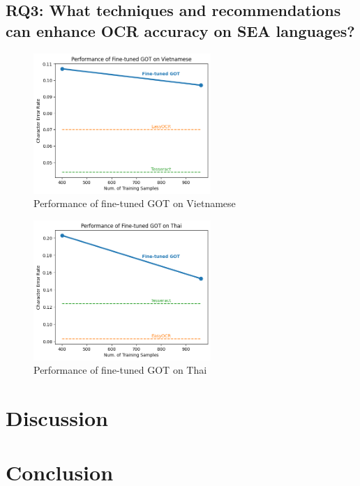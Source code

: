 \documentclass[12pt,oneside]{memoir}
\begin{document}
\section{RQ3: What techniques and recommendations can enhance OCR accuracy on SEA languages?}

\begin{figure}[ht]
    \centering
    \includegraphics[width=0.6\textwidth]{images/fine-tuned-got-vietnamese.png}
    \caption{Performance of fine-tuned GOT on Vietnamese}
    \label{figure:fine-tuned-got-vietnamese}
\end{figure}

\begin{figure}[ht]
    \centering
    \includegraphics[width=0.6\textwidth]{images/fine-tuned-got-thai.png}
    \caption{Performance of fine-tuned GOT on Thai}
    \label{figure:fine-tuned-got-thai}
\end{figure}

\chapter{Discussion}

\chapter{Conclusion}
\end{document}
